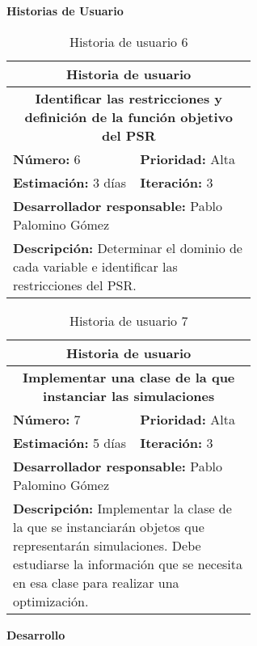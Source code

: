 \textbf{Historias de Usuario}\\
\begin{table}[H]
        \centering
        \begin{tabular}{|p{0.3\linewidth}|p{0.3\linewidth}|}
          \hline
          \multicolumn{2}{|c|}{Historia de usuario}\\ \hline
          \multicolumn{2}{|c|}{\textbf{Identificar las restricciones y definición de la función objetivo del PSR}}\\ \hline
          \textbf{Número:} 6 & \textbf{Prioridad:} Alta\\ \hline
          \textbf{Estimación:} 3 días & \textbf{Iteración:} 3\\ \hline
          \multicolumn{2}{|l|}{\textbf{Desarrollador responsable:} Pablo Palomino Gómez}\\ \hline
          \multicolumn{2}{|p{0.6\linewidth}|}{\textbf{Descripción:} Determinar el dominio de cada variable e identificar las restricciones del \gls{PSR}.}\\ \hline
        \end{tabular}
        \caption{Historia de usuario 6}
        \label{tab:hist6}
\end{table}
\begin{table}[H]
        \centering
        \begin{tabular}{|p{0.3\linewidth}|p{0.3\linewidth}|}
          \hline
          \multicolumn{2}{|c|}{Historia de usuario}\\ \hline
          \multicolumn{2}{|c|}{\textbf{Implementar una clase de la que instanciar las simulaciones}}\\ \hline
          \textbf{Número:} 7 & \textbf{Prioridad:} Alta\\ \hline
          \textbf{Estimación:} 5 días & \textbf{Iteración:} 3\\ \hline
          \multicolumn{2}{|l|}{\textbf{Desarrollador responsable:} Pablo Palomino Gómez}\\ \hline
          \multicolumn{2}{|p{0.6\linewidth}|}{\textbf{Descripción:} Implementar la clase de la que se instanciarán objetos que representarán simulaciones. Debe estudiarse la información que se necesita en esa clase para realizar una optimización.}\\ \hline
        \end{tabular}
        \caption{Historia de usuario 7}
        \label{tab:hist7}
\end{table}
\textbf{Desarrollo}\\

